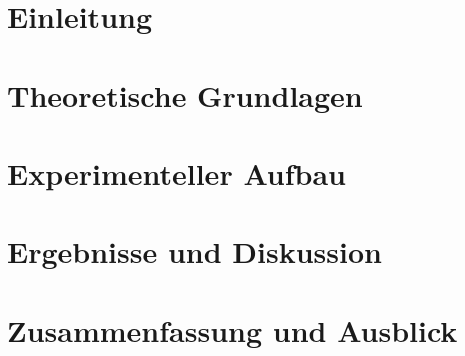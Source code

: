 \chapter{Einleitung}

\chapter{Theoretische Grundlagen}

\chapter{Experimenteller Aufbau}

\chapter{Ergebnisse und Diskussion}

\chapter{Zusammenfassung und Ausblick}

%
%
%